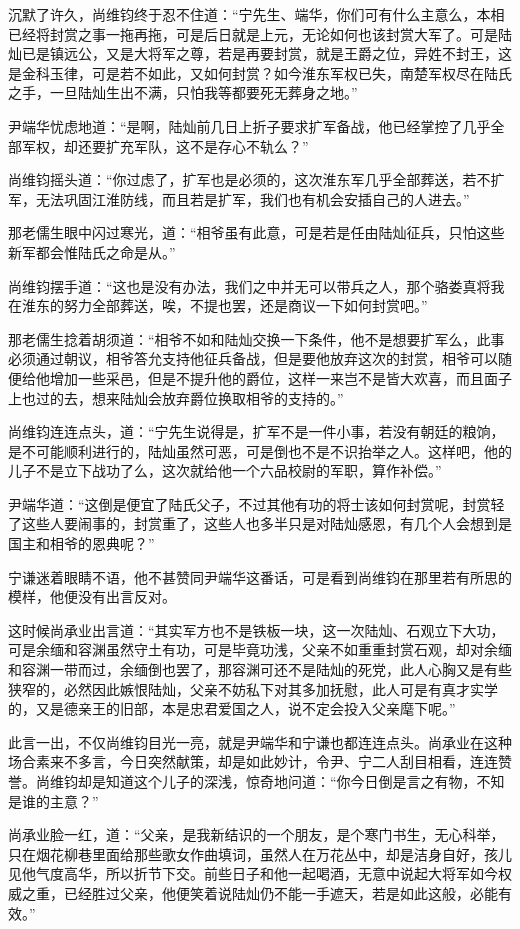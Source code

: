 沉默了许久，尚维钧终于忍不住道：“宁先生、端华，你们可有什么主意么，本相已经将封赏之事一拖再拖，可是后日就是上元，无论如何也该封赏大军了。可是陆灿已是镇远公，又是大将军之尊，若是再要封赏，就是王爵之位，异姓不封王，这是金科玉律，可是若不如此，又如何封赏？如今淮东军权已失，南楚军权尽在陆氏之手，一旦陆灿生出不满，只怕我等都要死无葬身之地。”

尹端华忧虑地道：“是啊，陆灿前几日上折子要求扩军备战，他已经掌控了几乎全部军权，却还要扩充军队，这不是存心不轨么？”

尚维钧摇头道：“你过虑了，扩军也是必须的，这次淮东军几乎全部葬送，若不扩军，无法巩固江淮防线，而且若是扩军，我们也有机会安插自己的人进去。”

那老儒生眼中闪过寒光，道：“相爷虽有此意，可是若是任由陆灿征兵，只怕这些新军都会惟陆氏之命是从。”

尚维钧摆手道：“这也是没有办法，我们之中并无可以带兵之人，那个骆娄真将我在淮东的努力全部葬送，唉，不提也罢，还是商议一下如何封赏吧。”

那老儒生捻着胡须道：“相爷不如和陆灿交换一下条件，他不是想要扩军么，此事必须通过朝议，相爷答允支持他征兵备战，但是要他放弃这次的封赏，相爷可以随便给他增加一些采邑，但是不提升他的爵位，这样一来岂不是皆大欢喜，而且面子上也过的去，想来陆灿会放弃爵位换取相爷的支持的。”

尚维钧连连点头，道：“宁先生说得是，扩军不是一件小事，若没有朝廷的粮饷，是不可能顺利进行的，陆灿虽然可恶，可是倒也不是不识抬举之人。这样吧，他的儿子不是立下战功了么，这次就给他一个六品校尉的军职，算作补偿。”

尹端华道：“这倒是便宜了陆氏父子，不过其他有功的将士该如何封赏呢，封赏轻了这些人要闹事的，封赏重了，这些人也多半只是对陆灿感恩，有几个人会想到是国主和相爷的恩典呢？”

宁谦迷着眼睛不语，他不甚赞同尹端华这番话，可是看到尚维钧在那里若有所思的模样，他便没有出言反对。

这时候尚承业出言道：“其实军方也不是铁板一块，这一次陆灿、石观立下大功，可是余缅和容渊虽然守土有功，可是毕竟功浅，父亲不如重重封赏石观，却对余缅和容渊一带而过，余缅倒也罢了，那容渊可还不是陆灿的死党，此人心胸又是有些狭窄的，必然因此嫉恨陆灿，父亲不妨私下对其多加抚慰，此人可是有真才实学的，又是德亲王的旧部，本是忠君爱国之人，说不定会投入父亲麾下呢。”

此言一出，不仅尚维钧目光一亮，就是尹端华和宁谦也都连连点头。尚承业在这种场合素来不多言，今日突然献策，却是如此妙计，令尹、宁二人刮目相看，连连赞誉。尚维钧却是知道这个儿子的深浅，惊奇地问道：“你今日倒是言之有物，不知是谁的主意？”

尚承业脸一红，道：“父亲，是我新结识的一个朋友，是个寒门书生，无心科举，只在烟花柳巷里面给那些歌女作曲填词，虽然人在万花丛中，却是洁身自好，孩儿见他气度高华，所以折节下交。前些日子和他一起喝酒，无意中说起大将军如今权威之重，已经胜过父亲，他便笑着说陆灿仍不能一手遮天，若是如此这般，必能有效。”

